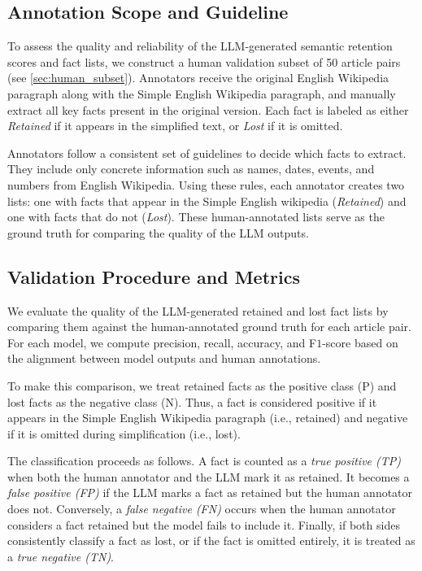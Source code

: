 \documentclass{DESSThesis}
\begin{document}
\subsection{Annotation Scope and Guideline}
\label{subsec:annotation}
To assess the quality and reliability of the LLM-generated semantic retention scores and fact lists, we construct a human validation subset of 50 article pairs (see \autoref{sec:human_subset}). Annotators receive the original English Wikipedia paragraph along with the Simple English Wikipedia paragraph, and manually extract all key facts present in the original version. Each fact is labeled as either \textit{Retained} if it appears in the simplified text, or \textit{Lost} if it is omitted.  

Annotators follow a consistent set of guidelines to decide which facts to extract. They include only concrete information such as names, dates, events, and numbers from English Wikipedia. Using these rules, each annotator creates two lists: one with facts that appear in the Simple English wikipedia (\textit{Retained}) and one with facts that do not (\textit{Lost}). These human-annotated lists serve as the ground truth for comparing the quality of the LLM outputs.  

\subsection{Validation Procedure and Metrics}
\label{subsec:validation}

We evaluate the quality of the LLM-generated retained and lost fact lists by comparing them against the human-annotated ground truth for each article pair. For each model, we compute precision, recall, accuracy, and F\(1\)-score based on the alignment between model outputs and human annotations.

To make this comparison, we treat retained facts as the positive class (P) and lost facts as the negative class (N). Thus, a fact is considered positive if it appears in the Simple English Wikipedia paragraph (i.e., retained) and negative if it is omitted during simplification (i.e., lost).

The classification proceeds as follows. A fact is counted as a \textit{true positive (TP)} when both the human annotator and the LLM mark it as retained. It becomes a \textit{false positive (FP)} if the LLM marks a fact as retained but the human annotator does not. Conversely, a \textit{false negative (FN)} occurs when the human annotator considers a fact retained but the model fails to include it. Finally, if both sides consistently classify a fact as lost, or if the fact is omitted entirely, it is treated as a \textit{true negative (TN)}.
\end{document}
